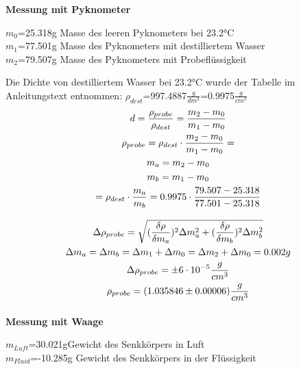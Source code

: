 \documentclass{article}
\begin{document}
\textbf{Messung mit Pyknometer}
\begin{center}
\begin{itemize}

$m_0$=25.318g \hspace{1cm} Masse des leeren Pyknometers bei 23.2°C \\
$m_1$=77.501g \hspace{1cm} Masse des Pyknometers mit destilliertem Wasser \\
$m_2$=79.507g \hspace{1cm} Masse des Pyknometers mit Probeflüssigkeit \\
\end{itemize}
\end{center}
Die Dichte von destilliertem Wasser bei 23.2°C wurde der Tabelle im Anleitungstext entnommen: $\rho_{dest}$=997.4887$\frac{g}{dm^3}$=0.9975$\frac{g}{cm^3}$
\begin{gather*}
d=\frac{\rho_{probe}}{\rho_{dest}}=\frac{m_2 - m_0}{m_1 - m_0}\\
\rho_{probe}=\rho_{dest}\cdot\frac{m_2 - m_0}{m_1 - m_0}= \\
m_a = m_2 - m_0 \\ m_b = m_1 - m_0 \\
\vspace{0.3cm}
= \rho_{dest}\cdot\frac{m_a}{m_b}= 0.9975\cdot\frac{79.507 - 25.318}{77.501 - 25.318} \\
\Delta \rho_{probe}=\sqrt{(\frac{\delta\rho}{\delta m_a})^2\Delta m_a^2+(\frac{\delta\rho}{\delta m_b})^2\Delta m_b^2} \\
\Delta m_a = \Delta m_b = \Delta m_1 + \Delta m_0 = \Delta m_2 + \Delta m_0 = 0.002g \\
\Delta \rho_{probe}=\pm6\cdot10^{-5}\frac{g}{cm^3} \\
\vspace{0.3cm}
\rho_{probe}=(1.035846  \pm 0.00006 )\frac{g}{cm^3}
\end{gather*}
\textbf{Messung mit Waage}
\begin{center}
\begin{itemize}

$m_{Luft}$=30.021g\hspace{1cm}Gewicht des Senkkörpers in Luft\\
$m_{Fluid}$=-10.285g \hspace{0.7cm}Gewicht des Senkkörpers in der Flüssigkeit\\
\end{itemize}
\end{center}
\end{document}
